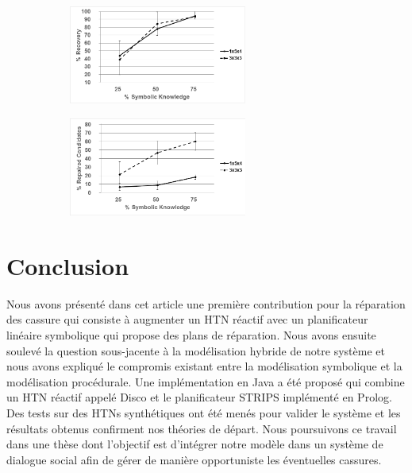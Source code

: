 \documentclass[a4paper,twoside,french]{article}
\begin{document}
		\begin{figure}[t]
			\centering
			\begin{subfigure}{2.3in}
				\centerline{\includegraphics[width=2.3in]{figs/recovery}}
				\vskip 8pt 
			\end{subfigure}
			\hfill
			\begin{subfigure}{2.3in}
				\centerline{\includegraphics[width=2.3in]{figs/candidates}}
				\vskip 8pt 
			\end{subfigure}
			\vskip 6pt
		\end{figure}
\section{Conclusion}
Nous avons présenté dans cet article une première contribution pour la réparation des cassure qui consiste à augmenter un HTN réactif avec un planificateur linéaire symbolique qui propose des plans de réparation. Nous avons ensuite soulevé la question sous-jacente à la modélisation hybride de notre système et nous avons expliqué le compromis existant entre la modélisation symbolique et la modélisation procédurale. Une implémentation en Java a été proposé qui combine un HTN réactif appelé Disco et le planificateur STRIPS implémenté en Prolog. Des tests sur des HTNs synthétiques ont été menés pour valider le système et les résultats obtenus confirment nos théories de départ. Nous poursuivons ce travail dans une thèse dont l'objectif est d'intégrer notre modèle dans un système de dialogue social afin de gérer de manière opportuniste les éventuelles cassures.
		\vskip 4pt
		
		{\footnotesize
				} %
							
				
\end{document}
